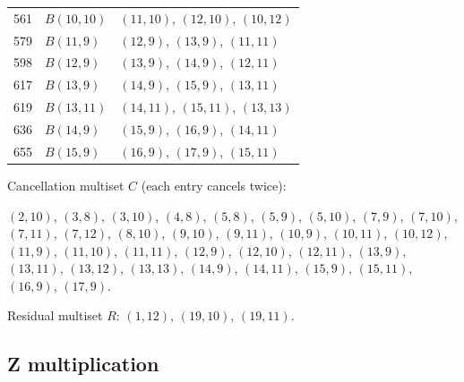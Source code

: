 \documentclass{article}
\begin{document}
\begin{center}
\begin{tabular}{lll}
  561 & \(B(10, 10)\) & \((11, 10)\), \((12, 10)\), \((10, 12)\) \\
  579 & \(B(11, 9)\) & \((12, 9)\), \((13, 9)\), \((11, 11)\) \\
  598 & \(B(12, 9)\) & \((13, 9)\), \((14, 9)\), \((12, 11)\) \\
  617 & \(B(13, 9)\) & \((14, 9)\), \((15, 9)\), \((13, 11)\) \\
  619 & \(B(13, 11)\) & \((14, 11)\), \((15, 11)\), \((13, 13)\) \\
  636 & \(B(14, 9)\) & \((15, 9)\), \((16, 9)\), \((14, 11)\) \\
  655 & \(B(15, 9)\) & \((16, 9)\), \((17, 9)\), \((15, 11)\) \\
\end{tabular}
\end{center}

Cancellation multiset \(C\) (each entry cancels twice):

\((2, 10)\), \((3, 8)\), \((3, 10)\), \((4, 8)\), \((5, 8)\), \((5, 9)\), \((5, 10)\), \((7, 9)\), \((7, 10)\), \((7, 11)\), \((7, 12)\), \((8, 10)\), \((9, 10)\), \((9, 11)\), \((10, 9)\), \((10, 11)\), \((10, 12)\), \((11, 9)\), \((11, 10)\), \((11, 11)\), \((12, 9)\), \((12, 10)\), \((12, 11)\), \((13, 9)\), \((13, 11)\), \((13, 12)\), \((13, 13)\), \((14, 9)\), \((14, 11)\), \((15, 9)\), \((15, 11)\), \((16, 9)\), \((17, 9)\).

Residual multiset \(R\): \((1, 12)\), \((19, 10)\), \((19, 11)\).

\subsection{Z multiplication}\label{sec:z-multiplication}
\end{document}
